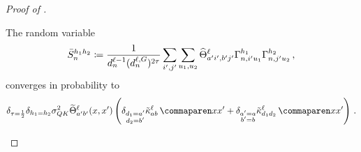 \begin{proof}[Proof of ]
    \begin{lemma}\label{lem:vv_subtask_convg}
        The random variable 
        \begin{align*}
            \bar{S}_{n}^{h_1 h_2}
            \coloneqq
            \frac{1}{d_{n}^{\ell - 1} (d_{n}^{\ell, G})^{2\tau}}
            \sum_{i', j'}
            \sum_{\substack{u_1 , u_2}}
                    \widehat{\Theta}_{
                        a' i' , b' j'
                    }^{\ell}
                    \Gamma_{n, i' u_1}^{h_1}
                    \Gamma_{n, j' u_2}^{h_2}
            \, ,
        \end{align*}
        converges in probability to
        $$
            \delta_{\scaling = \frac{1}{2}}
            \delta_{\headIndex_1 = \headIndex_2}
            \QKVar
            \ntktilde_{\gIndexA \gIndexB}^{\depthSymbol}(\inputSymbol, \inputSymbol')
            \left( 
                \delta_{\substack{d_1 = \gIndexA \\ d_2 = \gIndexB}}
                \kerntildef{\fIndexA \fIndexB}{\depthSymbol}{\inputSymbol}{\inputSymbol'}
                +
                \delta_{\substack{\gIndexA = \fIndexA \\ \gIndexB = \fIndexB}}
                \kerntildef{d_1 d_2}{\depthSymbol}{\inputSymbol}{\inputSymbol'}
            \right)
            \, .
        $$
    \end{lemma}
    

\end{proof}
